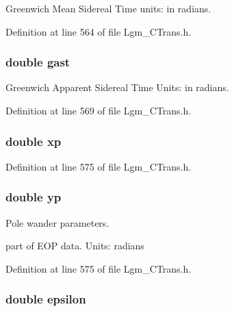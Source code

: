 Greenwich Mean Sidereal Time units: in radians. 



Definition at line 564 of file Lgm\_\-CTrans.h.\hypertarget{struct_lgm___c_trans_ada0c250aaba2d37baa06b1363b2adf7}{
\subsubsection[{gast}]{\setlength{\rightskip}{0pt plus 5cm}double {\bf gast}}}
\label{struct_lgm___c_trans_ada0c250aaba2d37baa06b1363b2adf7}


Greenwich Apparent Sidereal Time Units: in radians. 



Definition at line 569 of file Lgm\_\-CTrans.h.\hypertarget{struct_lgm___c_trans_f649efec4c4f51f4db0ebb935a83d015}{
\subsubsection[{xp}]{\setlength{\rightskip}{0pt plus 5cm}double {\bf xp}}}
\label{struct_lgm___c_trans_f649efec4c4f51f4db0ebb935a83d015}




Definition at line 575 of file Lgm\_\-CTrans.h.\hypertarget{struct_lgm___c_trans_7841edcbdbfea2b400dea7753dcfac9e}{
\subsubsection[{yp}]{\setlength{\rightskip}{0pt plus 5cm}double {\bf yp}}}
\label{struct_lgm___c_trans_7841edcbdbfea2b400dea7753dcfac9e}


Pole wander parameters. 

part of EOP data. Units: radians 

Definition at line 575 of file Lgm\_\-CTrans.h.\hypertarget{struct_lgm___c_trans_4904cc82627458fdf6672ccc0b2802c7}{
\subsubsection[{epsilon}]{\setlength{\rightskip}{0pt plus 5cm}double {\bf epsilon}}}
\label{struct_lgm___c_trans_4904cc82627458fdf6672ccc0b2802c7}



